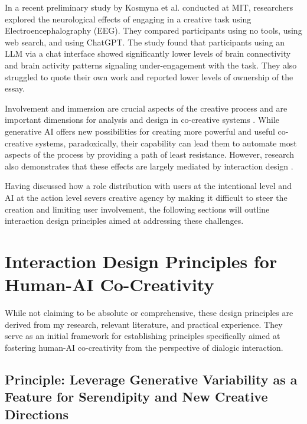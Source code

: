 In a recent preliminary study by Kosmyna et al. \cite{Kosmyna2025-cm} conducted at MIT, researchers explored the neurological effects of engaging in a creative task using Electroencephalography (EEG). They compared participants using no tools, using web search, and using ChatGPT. The study found that participants using an LLM via a chat interface showed significantly lower levels of brain connectivity and brain activity patterns signaling under-engagement with the task. They also struggled to quote their own work and reported lower levels of ownership of the essay.

Involvement and immersion are crucial aspects of the creative process \cite{Amabile1996-pt, Csikszentmihalyi1997-ui} and are important dimensions for analysis and design in co-creative systems \cite{Davis2016-te, Cherry2014-ty, Rezwana2022-ui, Clark2018-yf, Lawton2023-gd, Yuan2022-kb, Li2024-yh, Kantosalo2015-pk, Resnick2005-fs}. While generative AI offers new possibilities for creating more powerful and useful co-creative systems, paradoxically, their capability can lead them to automate most aspects of the process by providing a path of least resistance.
However, research also demonstrates that these effects are largely mediated by interaction design \cite{Kim2023-wt, Essel2024-qc}.

Having discussed how a role distribution with users at the intentional level and AI at the action level severs creative agency by making it difficult to steer the creation and limiting user involvement, the following sections will outline interaction design principles aimed at addressing these challenges.

\section{Interaction Design Principles for Human-AI Co-Creativity}

While not claiming to be absolute or comprehensive, these design principles are derived from my research, relevant literature, and practical experience. They serve as an initial framework for establishing principles specifically aimed at fostering human-AI co-creativity from the perspective of dialogic interaction.

\subsection{Principle: Leverage Generative Variability as a Feature for Serendipity and New Creative Directions}

